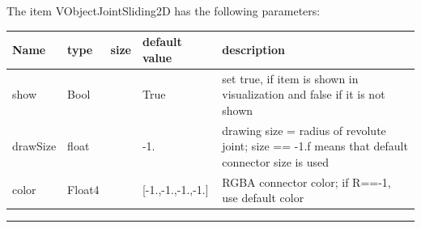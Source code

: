 The item VObjectJointSliding2D has the following parameters:\vspace{-1cm}\\ 
\begin{center}
  \footnotesize
  \begin{longtable}{| p{4.5cm} | p{2.5cm} | p{0.5cm} | p{2.5cm} | p{6cm} |}
    \hline
    \bf Name & \bf type & \bf size & \bf default value & \bf description \\ \hline
    show &     Bool &      &     True &     set true, if item is shown in visualization and false if it is not shown\\ \hline
    drawSize &     float &      &     -1. &     drawing size = radius of revolute joint; size == -1.f means that default connector size is used\\ \hline
    color &     Float4 &      &     [-1.,-1.,-1.,-1.] &     RGBA connector color; if R==-1, use default color\\ \hline
	  \end{longtable}
	\end{center}
\par\noindent\rule{\textwidth}{0.4pt}
\label{description_ObjectJointSliding2D}
